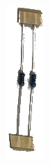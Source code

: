 \documentclass[10pt]{article}
\begin{document}
	\begin{minipage}{0.025\textwidth}\raggedleft
		\includegraphics[width=\linewidth]{resistor.png}
	\end{minipage}
	\noindent
	
\end{document}
